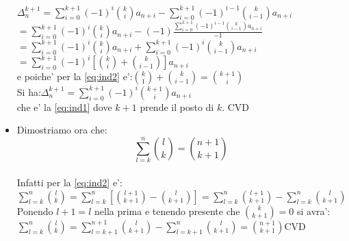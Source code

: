 \documentclass[12pt,a4paper]{article}
\begin{document}
\begin{flushleft}
\begin{itemize}
{\vspace{5mm}
$\Delta_n^{k+1}=\sum_{i=0}^{k+1}(-1)^{i}\binom{k}{i}a_{n+i}-\sum_{i=0}^{k+1}(-1)^{i-1}\binom{k}{i-1}a_{n+i}$\\
\vspace{5mm}
\hspace{10mm}$=\sum_{i=0}^{k+1}(-1)^{i}\binom{k}{i}a_{n+i}-(-1)\frac{\sum_{i=0}^{k+1}(-1)^{i-1}\binom{k}{i-1}a_{n+i}}{-1}$\\
\vspace{5mm}
\hspace{10mm}$=\sum_{i=0}^{k+1}(-1)^{i}\binom{k}{i}a_{n+i}+\sum_{i=0}^{k+1}(-1)^{i}\binom{k}{i-1}a_{n+i}$\\
\vspace{5mm}
\hspace{10mm}$=\sum_{i=0}^{k+1}(-1)^{i}[\binom{k}{i}+\binom{k}{i-1}]a_{n+i}$\hspace{5mm}\\
\vspace{5mm}
e poiche' per la \eqref{eq:ind2} e':\hspace{10mm}$\binom{k}{1}+\binom{k}{i-1}=\binom{k+1}{i}$\\
\vspace{5mm}
Si ha:\hspace{10mm}$\Delta_n^{k+1}=\sum_{i=0}^{k+1}(-1)^{i}\binom{k+1}{i}a_{n+i}$\\
\vspace{5mm}
che e' la \eqref{eq:ind1} dove $k+1$ prende il posto di $k$.  CVD\\
}
\item{Dimostriamo ora che:
\begin{equation}
\label{eq:ind3}
\sum_{l=k}^{n}{\binom{l}{k}}=\binom{n+1}{k+1}
\end{equation}
\\
\vspace{5mm}
Infatti per la \eqref{eq:ind2} e':\\
\vspace{5mm}
$\sum_{l=k}^{n}{\binom{l}{k}}=\sum_{l=k}^{n}{[\binom{l+1}{k+1}-\binom{l}{k+1}]}=\sum_{l=k}^{n}{\binom{l+1}{k+1}}-\sum_{l=k}^{n}{\binom{l}{k+1}}$\\
\vspace{5mm}
Ponendo $l+1=l$ nella prima e tenendo presente che $\binom{k}{k+1}=0$ si avra':\\
\vspace{5mm}
$\sum_{l=k}^{n}{\binom{l}{k}}=\sum_{l=k+1}^{n+1}{\binom{l}{k+1}}-\sum_{l=k+1}^{n}{\binom{l}{k+1}}=\binom{n+1}{k+1}$\hspace{10mm}CVD\\
}
\end{itemize}
\end{flushleft}
\end{document}
